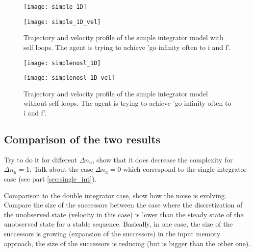 \begin{figure}[!ht]
	\begin{minipage}[b]{0.5\textwidth}
  		\centering
  		\texttt{[image: simple\_1D]}
	  	\label{simple_1D}
  \end{minipage}
	\begin{minipage}[b]{0.5\textwidth}
  		\centering
  		\texttt{[image: simple\_1D\_vel]}
	  	\label{simple_1D_vel}
  \end{minipage}
  \caption{Trajectory and velocity profile of the simple integrator model with self loops. The agent is trying to achieve 'go infinity often to i and f'.}
\end{figure}

\begin{figure}[!ht]
	\begin{minipage}[b]{0.5\textwidth}
  		\centering
  		\texttt{[image: simplenosl\_1D]}
	  	\label{simplenosl_1D}
  \end{minipage}
	\begin{minipage}[b]{0.5\textwidth}
  		\centering
  		\texttt{[image: simplenosl\_1D\_vel]}
	  	\label{simplenosl_1D_vel}
  \end{minipage}
  \caption{Trajectory and velocity profile of the simple integrator model without self loops. The agent is trying to achieve 'go infinity often to i and f'.}
\end{figure}

\subsection{Comparison of the two results}

Try to do it for different $\Delta n_u$, show that it does decrease the complexity for $\Delta n_u = 1$. Talk about the case $\Delta n_u = 0$ which correspond to the single integrator case (see part \ref{sec:single_int}).

Comparison to the double integrator case, show how the noise is evolving. Compare the size of the successors between the case where the discretization of the unobserved state (velocity in this case) is lower than the steady state of the unobserved state for a stable sequence. Basically, in one case, the size of the successors is growing (expansion of the successors) in the input memory approach, the size of the successors is reducing (but is bigger than the other one).


